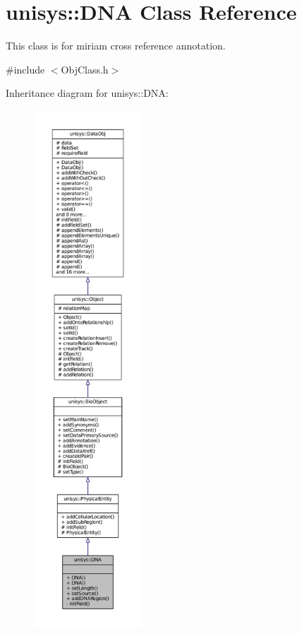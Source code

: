 \hypertarget{classunisys_1_1DNA}{\section{unisys\-:\-:D\-N\-A Class Reference}
\label{classunisys_1_1DNA}
}


This class is for miriam cross reference annotation.  




{\ttfamily \#include $<$Obj\-Class.\-h$>$}



Inheritance diagram for unisys\-:\-:D\-N\-A\-:
\nopagebreak
\begin{figure}[H]
\begin{center}
\leavevmode
\includegraphics[height=550pt]{classunisys_1_1DNA__inherit__graph}
\end{center}
\end{figure}



